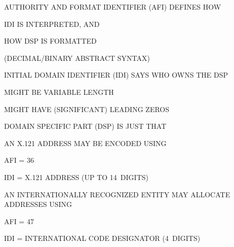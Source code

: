 \begin{bwslide}

\begin{nrtc}
\item	AUTHORITY AND FORMAT IDENTIFIER (AFI) DEFINES HOW
    \begin{nrtc}
    \item	IDI IS INTERPRETED, AND

    \item	HOW DSP IS FORMATTED
	\begin{nrtc}
	\item	(DECIMAL/BINARY ABSTRACT SYNTAX)
	\end{nrtc}
    \end{nrtc}

\item	INITIAL DOMAIN IDENTIFIER (IDI) SAYS WHO OWNS THE DSP
    \begin{nrtc}
    \item	MIGHT BE VARIABLE LENGTH

    \item	MIGHT HAVE (SIGNIFICANT) LEADING ZEROS
    \end{nrtc}

\item	DOMAIN SPECIFIC PART (DSP) IS JUST THAT
\end{nrtc}
\end{bwslide}


\begin{bwslide}

\begin{nrtc}
\item	AN X.121 ADDRESS MAY BE ENCODED USING
    \begin{nrtc}
    \item	AFI = 36

    \item	IDI = X.121 ADDRESS (UP TO 14~DIGITS)
    \end{nrtc}
\end{nrtc}

\end{bwslide}


\begin{bwslide}

\begin{nrtc}
\item	AN INTERNATIONALLY RECOGNIZED ENTITY MAY ALLOCATE ADDRESSES USING
    \begin{nrtc}
    \item	AFI = 47

    \item	IDI = INTERNATIONAL CODE DESIGNATOR (4~DIGITS)
    \end{nrtc}
\end{nrtc}

\end{bwslide}


